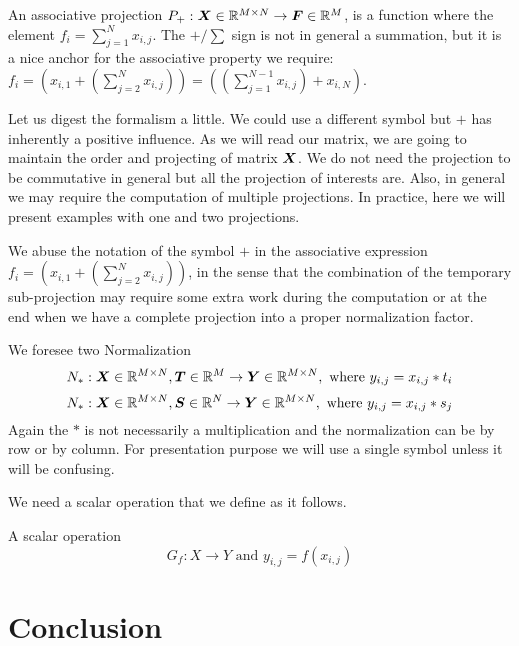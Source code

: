 \documentclass[acmsmall]{acmart}
\begin{document}
\begin{definition}
An associative projection $P_+: {\boldsymbol X}\in\mathbb{R}^{M\times N} \rightarrow
{\boldsymbol F} \in \mathbb{R}^{M}$, is a function where the element $f_i =
\sum_{j=1}^N x_{i,j}$. The $+/\sum$ sign is not in general a
summation, but it is a nice anchor for the associative property we
require: $f_i = (x_{i,1} + (\sum_{j=2}^N x_{i,j})) = ((\sum_{j=1}^{N-1}
x_{i,j}) + x_{i,N}) $.
\end{definition}

Let us digest the formalism a little. We could use a different symbol
but $+$ has inherently a positive influence. As we will read our
matrix, we are going to maintain the order and projecting of matrix
${\boldsymbol X}$. We do not need the projection to be commutative in general
but all the projection of interests are. Also, in general we may
require the computation of multiple projections. In practice, here we
will present examples with one and two projections.

We abuse the notation of the symbol $+$ in the associative expression
$f_i = (x_{i,1} + (\sum_{j=2}^N x_{i,j}))$, in the sense that the
combination of the temporary sub-projection may require some extra
work during the computation or at the end when we have a complete
projection into a proper normalization factor.

\begin{definition}
  We foresee two Normalization
  \begin{equation}
    N_*: {\boldsymbol X}\in\mathbb{R}^{M\times N}, {\boldsymbol T}\in \mathbb{R}^M \rightarrow {\boldsymbol Y}
    \in \mathbb{R}^{M\times N}, \text{ where } y_{i,j} = x_{i,j}*t_i
  \end{equation}
  \begin{equation}
    N_*: {\boldsymbol X}\in\mathbb{R}^{M\times N}, {\boldsymbol S}\in \mathbb{R}^N \rightarrow {\boldsymbol Y}
    \in \mathbb{R}^{M\times N}, \text{ where } y_{i,j} = x_{i,j}*s_j
  \end{equation}
  Again the $*$ is not necessarily a multiplication and the
  normalization can be by row or by column. For presentation purpose
  we will use a single symbol unless it will be confusing.
\end{definition}

We need a scalar operation that we define as it follows.
\begin{definition}
  A scalar operation
  \begin{equation}
    G_f: X \rightarrow Y \text{ and }  y_{i,j} = f(x_{i,j})
  \end{equation}
\end{definition}



\section{Conclusion}


  







%

 

%
\end{document}
